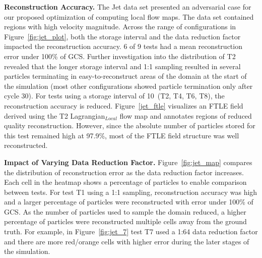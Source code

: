 


\textbf{Reconstruction Accuracy.} The Jet data set presented an adversarial case for our proposed optimization of computing local flow maps.
%
The data set contained regions with high velocity magnitude.
%
Across the range of configurations in Figure~\ref{fig:jet_plot}, both the storage interval and the data reduction factor impacted the reconstruction accuracy.
%
6 of 9 tests had a mean reconstruction error under 100\% of GCS. 
%
Further investigation into the distribution of T2 revealed that the longer storage interval and 1:1 sampling resulted in several particles terminating in easy-to-reconstruct areas of the domain at the start of the simulation (most other configurations showed particle termination only after cycle 30).
%
For tests using a storage interval of 10~(T2, T4, T6, T8), the reconstruction accuracy is reduced.
%
%
Figure~\ref{jet_ftle} visualizes an FTLE field derived using the T2 Lagrangian$_{Local}$ flow map and annotates regions of reduced quality reconstruction.
%
However, since the absolute number of particles stored for this test remained high at 97.9\%, most of the FTLE field structure was well reconstructed.
%
%

\textbf{Impact of Varying Data Reduction Factor.} Figure~\ref{fig:jet_map} compares the distribution of reconstruction error as the data reduction factor increases. 
%
Each cell in the heatmap shows a percentage of particles to enable comparison between tests.
%
For test T1 using a 1:1 sampling, reconstruction accuracy was high and a larger percentage of particles were reconstructed with error under 100\% of GCS.
%
As the number of particles used to sample the domain reduced, a higher percentage of particles were reconstructed multiple cells away from the ground truth. 
%
For example, in Figure~\ref{fig:jet_7} test T7 used a 1:64 data reduction factor and there are more red/orange cells with higher error during the later stages of the simulation. 
%
%
%
%

